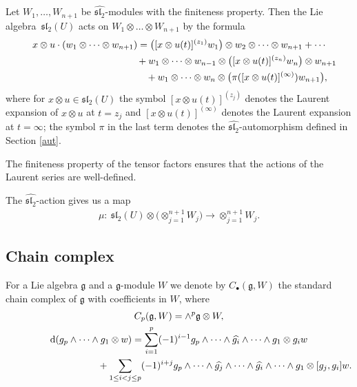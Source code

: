 \documentclass[pdftex]{sigma}
\numberwithin{equation}{section}
\begin{document}
Let $W_1,\dots,W_{n+1}$ be $\widehat{{\mathfrak{sl}_2}}$-modules with the finiteness property. Then the Lie algebra~$\mathfrak{sl}_2(U)$ acts on $W_1\otimes\dots\otimes W_{n+1}$ by the formula
\begin{gather*}
x\otimes u \cdot (w_1\otimes\dots\otimes w_{n+1}) = \big([x\otimes u(t)]^{(z_1)} w_1\big)
\otimes w_2\otimes\dots\otimes w_{n+1}+ \cdots \nonumber\\
\hphantom{x\otimes u \cdot (w_1\otimes\dots\otimes w_{n+1}) =}{} + w_1\otimes\dots\otimes w_{n-1}\otimes \big([x\otimes u(t)]^{(z_n)} w_n\big)\otimes w_{n+1} \nonumber\\
\hphantom{x\otimes u \cdot (w_1\otimes\dots\otimes w_{n+1}) =}{} + w_1\otimes\dots\otimes w_n\otimes \big(\pi([x\otimes u(t)]^{(\infty)}) w_{n+1}\big), %
\end{gather*}
where for $x\otimes u \in\mathfrak{sl}_2(U)$ the symbol $[x\otimes u(t)]^{(z_j)}$ denotes the Laurent expansion of $x\otimes u$ at $t=z_j$ and $[x\otimes u(t)]^{(\infty)}$ denotes the Laurent expansion at $t=\infty$; the symbol $\pi$ in the last term denotes the $\widehat{{\mathfrak{sl}_2}}$-automorphism defined in Section \ref{aut}.

The finiteness property of the tensor factors ensures that the actions of the Laurent series are well-defined.

The $\widehat{{\mathfrak{sl}_2}}$-action gives us a map
\begin{gather}\label{mult}
\mu\colon \ \mathfrak{sl}_2(U)\otimes \big(\otimes_{j=1}^{n+1} W_j\big) \to \otimes_{j=1}^{n+1} W_j .
\end{gather}

\subsection{Chain complex}
For a Lie algebra ${\mathfrak g}$ and a ${\mathfrak g}$-module $W$ we denote by $C_{\bullet}({\mathfrak g}, W)$ the standard chain complex of ${\mathfrak g}$ with coefficients in $W$, where
\begin{gather*}
 C_p({\mathfrak g}, W) = \wedge ^p{\mathfrak g} \otimes W, \\
{\rm d}(g_p\wedge \dots\wedge g_1\otimes w) = \sum_{i=1}^p(-1)^{i-1} g_p\wedge \dots\wedge \widehat{g_i}\wedge\dots \wedge g_1\otimes g_iw \\
\hphantom{{\rm d}(g_p\wedge \dots\wedge g_1\otimes w) =}{} + \sum_{1\leq i<j\leq p}(-1)^{i+j} g_p\wedge \dots\wedge \widehat{g_j}\wedge\dots\wedge \widehat{g_i}\wedge\dots \wedge g_1\otimes [g_j,g_i]w.
\end{gather*}
\end{document}

